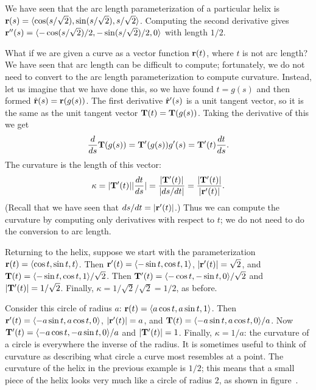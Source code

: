 \begin{example} We have seen that the arc length parameterization of a 
particular helix is ${\bf r}(s)=
\langle \cos(s/\sqrt2),\sin(s/\sqrt2),s/\sqrt2\rangle$.
Computing the second derivative gives
${\bf r}''(s)=
\langle -\cos(s/\sqrt2)/2,-\sin(s/\sqrt2)/2,0\rangle$ with length $1/2$.
\end{example} 

What if we are given a curve as a vector function ${\bf r}(t)$, where
$t$ is not arc length? We have seen that arc length can be difficult
to compute; fortunately, we do not need to convert to the arc length
parameterization to compute curvature. Instead, let us imagine that we have
done this, so we have found $t=g(s)$ and then formed
$\hat{\bf r}(s)={\bf r}(g(s))$. The first derivative $\hat{\bf r}'(s)$
is a unit tangent vector, so it is the same as the unit tangent vector
${\bf T}(t)={\bf T}(g(s))$. Taking the derivative of this we get
$${d\over ds}{\bf T}(g(s))= {\bf T}'(g(s)) g'(s)={\bf T}'(t){dt\over
  ds}.$$
The curvature is the length of this vector:
$$\kappa = |{\bf T}'(t)||{dt\over ds}|={|{\bf T}'(t)|\over|ds/dt|}=
{|{\bf T}'(t)|\over|{\bf r}'(t)|}.$$
(Recall that we have seen that $ds/dt=|{\bf r}'(t)|$.) Thus we can
compute the curvature by computing only derivatives with respect to
$t$; we do not need to do the conversion to arc length.

\begin{example} 
Returning to the helix, suppose we start with the parameterization
${\bf r}(t)=\langle \cos t,\sin t,t\rangle$. Then 
${\bf r}'(t)=\langle -\sin t,\cos t,1\rangle$, 
$|{\bf r}'(t)|=\sqrt2$, and ${\bf T}(t)=\langle -\sin t,\cos
t,1\rangle/\sqrt2$. Then
${\bf T}'(t)=\langle -\cos t,-\sin t,0\rangle/\sqrt2$ and 
$|{\bf T}'(t)|=1/\sqrt2$. Finally, $\kappa=1/\sqrt2/\sqrt2=1/2$,
as before.
\end{example} 

\begin{example} 
Consider this circle of radius $a$:
${\bf r}(t)=\langle a\cos t,a\sin t,1\rangle$. Then 
${\bf r}'(t)=\langle -a\sin t,a\cos t,0\rangle$, 
$|{\bf r}'(t)|=a$, and ${\bf T}(t)=\langle -a\sin t,a\cos
t,0\rangle/a$. Now
${\bf T}'(t)=\langle -a\cos t,-a\sin t,0\rangle/a$ and 
$|{\bf T}'(t)|=1$. Finally, $\kappa=1/a$:
the curvature of a circle is everywhere the inverse of the radius. It
is sometimes useful to think of curvature as describing what circle a
curve most resembles at a point. The curvature of the helix in the
previous example is $1/2$; this means that a small piece of the helix
looks very much like a circle of radius $2$, as shown in
figure~.
\end{example} 

